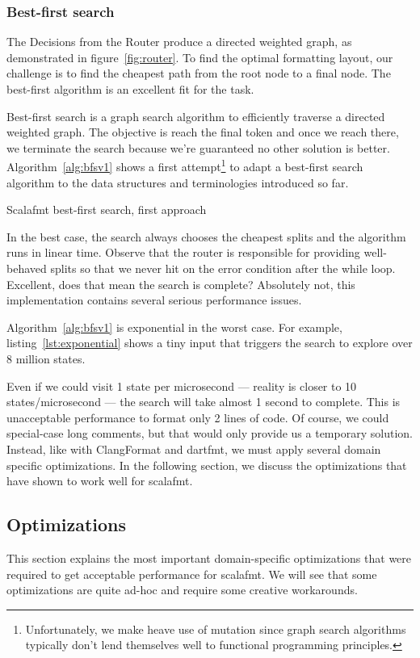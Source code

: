 \subsubsection{Best-first search}
The Decisions from the Router produce a directed weighted graph, as demonstrated in figure~\ref{fig:router}.
To find the optimal formatting layout, our challenge is to find the cheapest path from the root node to a final node.
The best-first\autocite{pearl_heuristics:_1984} algorithm is an excellent fit for the task.

Best-first search is a graph search algorithm to efficiently traverse a directed weighted graph.
The objective is reach the final token and once we reach there, we terminate the search because we're guaranteed no other solution is better.
Algorithm~\ref{alg:bfsv1} shows a first attempt\footnote{
  Unfortunately, we make heave use of mutation since graph search algorithms typically don't lend themselves well to functional programming principles.
} to adapt a best-first search algorithm to the data structures and terminologies introduced so far.
\begin{algorithm}
  \caption{Scalafmt best-first search, first approach}\label{alg:bfsv1}
  
\end{algorithm}
In the best case, the search always chooses the cheapest splits and the algorithm runs in linear time.
Observe that the router is responsible for providing well-behaved splits so that we never hit on the error condition after the while loop.
Excellent, does that mean the search is complete?
Absolutely not, this implementation contains several serious performance issues.

Algorithm~\ref{alg:bfsv1} is exponential in the worst case.
For example, listing~\ref{lst:exponential} shows a tiny input that triggers the search to explore over 8 million states.

Even if we could visit 1 state per microsecond --- reality is closer to 10 states/microsecond ---  the search will take almost 1 second to complete.
This is unacceptable performance to format only 2 lines of code.
Of course, we could special-case long comments, but that would only provide us a temporary solution.
Instead, like with ClangFormat and dartfmt, we must apply several domain specific optimizations.
In the following section, we discuss the optimizations that have shown to work well for scalafmt.

\subsection{Optimizations}\label{sec:optimizations}
This section explains the most important domain-specific optimizations that were required to get acceptable performance for scalafmt.
We will see that some optimizations are quite ad-hoc and require some creative workarounds.

